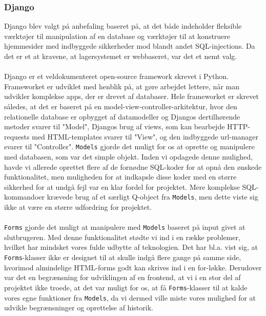 \documentclass[]{article}
\begin{document}
\subsubsection{Django}
\noindent Django blev valgt på anbefaling baseret på, at det både indeholder fleksible værktøjer til manipulation af en database og værktøjer til at konstruere hjemmesider med indbyggede sikkerheder mod blandt andet SQL-injections. Da det er et at kravene, at lagersystemet er webbaseret, var det et nemt valg.  \\ \\
Django er et veldokumenteret \cite{DjangoDoc} open-source framework skrevet i Python. Frameworket er udviklet med henblik på, at gøre arbejdet lettere, når man udvikler komplekse apps, der er drevet af databaser. Hele frameworket er skrevet således, at det er baseret på en model-view-controller-arkitektur, hvor den relationelle database er opbygget af datamodeller og Djangos dertilhørende metoder svarer til "Model", Djangos brug af views, som kan bearbejde HTTP-requests med HTML-templates svarer til "View", og den indbyggede url-manager svarer til "Controller". %
%
\texttt{Models} gjorde det muligt for os at oprette og manipulere med databasen, som var det simple objekt. Inden vi opdagede denne mulighed, havde vi allerede oprettet flere af de fornødne SQL-koder for at opnå den ønskede funktionalitet, men muligheden for at indkapsle disse koder med en større sikkerhed for at undgå fejl var en klar fordel for projektet. Mere komplekse SQL-kommandoer krævede brug af et særligt Q-object fra \texttt{Models}, men dette viste sig ikke at være en større udfordring for projektet. \\ \\
\texttt{Forms} gjorde det muligt at manipulere med \texttt{Models} baseret på input givet at slutbrugeren. Med denne funktionalitet stødte vi ind i en række problemer, hvilket har mindsket vores fulde udbytte af teknologien. Det har bl.a. vist sig, at \texttt{Forms}-klasser ikke er designet til at skulle indgå flere gange på samme side, hvorimod almindelige HTML-forms godt kan skrives ind i en for-løkke. Derudover var det en begrænsning for udviklingen af en frontend, at vi i en stor del af projektet ikke troede, at det var muligt for os, at få \texttt{Forms}-klasser til at kalde vores egne funktioner fra \texttt{Models}, da vi dermed ville miste vores mulighed for at udvikle begrænsninger og oprettelse af historik. \\ \\
\end{document}
